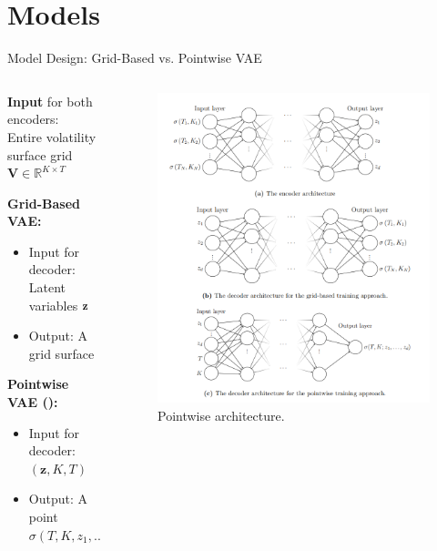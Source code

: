 \documentclass{beamer}
\begin{document}
\section{Models}



\begin{frame}{Model Design: Grid-Based vs. Pointwise VAE}
\begin{columns}
    \begin{column}{0.6\textwidth}
\textbf{Input} for both encoders: \\ Entire volatility surface grid \(\mathbf{V} \in \mathbb{R}^{K \times T}\)
\vspace{0.3cm}

\textbf{Grid-Based VAE:}
\begin{itemize}
    \item Input for decoder: Latent variables $\bf{z}$
    \item Output: A grid surface
\end{itemize}
\textbf{Pointwise VAE (\citet{vaeorigin}):}
\begin{itemize}
    \item Input for decoder: $ (\mathbf{z}, K, T) $
    \item Output: A point $\sigma(T,K,z_1,...z_d)$
\end{itemize}
  \end{column}
  \begin{column}{0.4\textwidth}
    \begin{figure}
\includegraphics[width=\textwidth]{docs/slides/img/vae_vol.png}
\caption{Pointwise architecture.}
\end{figure}
  \end{column}
\end{columns}
\end{frame}
\end{document}
